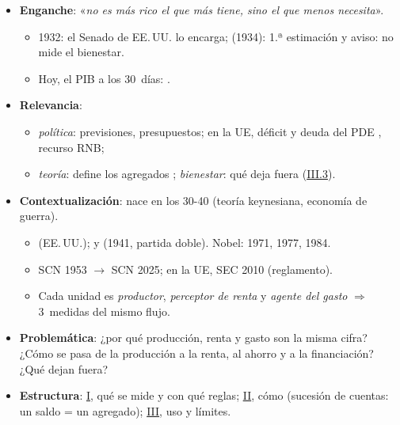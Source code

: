 \documentclass{article}
\begin{document}
\cabecerarepaso
\begin{columnas}

\begin{itemize}
\item \textbf{Enganche}: «\emph{no es más rico el que más tiene, sino el que menos necesita}».
  \begin{itemize}
  \item 1932: el Senado de EE.\,UU. lo encarga;  (1934): 1.ª estimación y aviso: no mide el bienestar.
  \item Hoy, el PIB a los 30~días: .
  \end{itemize}
\item \textbf{Relevancia}:
  \begin{itemize}
  \item \emph{política}: previsiones, presupuestos; en la UE, déficit y deuda del PDE , recurso RNB;
  \item \emph{teoría}: define los agregados ; \emph{bienestar}: qué deja fuera (\hyperref[rep:III.3]{III.3}).
  \end{itemize}
\item \textbf{Contextualización}: nace en los 30-40 (teoría keynesiana, economía de guerra).
  \begin{itemize}
  \item {} (EE.\,UU.);  y  (1941, partida doble). Nobel: 1971, 1977, 1984.
  \item SCN 1953 $\to$ SCN 2025; en la UE, SEC 2010 (reglamento).
  \item Cada unidad es \emph{productor}, \emph{perceptor de renta} y \emph{agente del gasto} $\Rightarrow$ 3~medidas del mismo flujo.
  \end{itemize}
\item \textbf{Problemática}: ¿por qué producción, renta y gasto son la misma cifra? ¿Cómo se pasa de la producción a la renta, al ahorro y a la financiación? ¿Qué dejan fuera?
\item \textbf{Estructura}: \hyperref[rep:I]{I}, qué se mide y con qué reglas; \hyperref[rep:II]{II}, cómo (sucesión de cuentas: un saldo = un agregado); \hyperref[rep:III]{III}, uso y límites.
\end{itemize}


\end{columnas}
\end{document}
